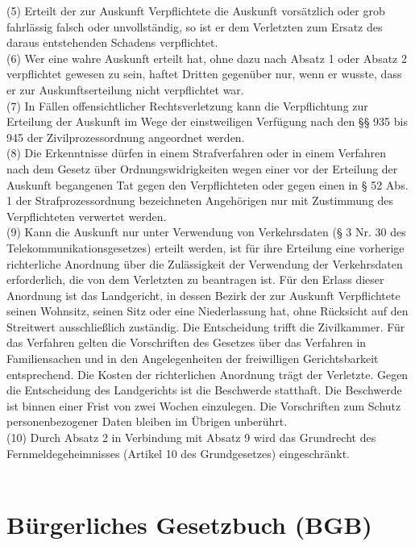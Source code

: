 \documentclass[12pt,titlepage]{report}
\begin{document}
(5) Erteilt der zur Auskunft Verpflichtete die Auskunft vorsätzlich oder grob fahrlässig falsch oder unvollständig, so ist er dem Verletzten zum Ersatz des daraus entstehenden Schadens verpflichtet.\\
(6) Wer eine wahre Auskunft erteilt hat, ohne dazu nach Absatz 1 oder Absatz 2 verpflichtet gewesen zu sein, haftet Dritten gegenüber nur, wenn er wusste, dass er zur Auskunftserteilung nicht verpflichtet war.\\
(7) In Fällen offensichtlicher Rechtsverletzung kann die Verpflichtung zur Erteilung der Auskunft im Wege der einstweiligen Verfügung nach den §§ 935 bis 945 der Zivilprozessordnung angeordnet werden.\\
(8) Die Erkenntnisse dürfen in einem Strafverfahren oder in einem Verfahren nach dem Gesetz über Ordnungswidrigkeiten wegen einer vor der Erteilung der Auskunft begangenen Tat gegen den Verpflichteten oder gegen einen in § 52 Abs. 1 der Strafprozessordnung bezeichneten Angehörigen nur mit Zustimmung des Verpflichteten verwertet werden.\\
(9) Kann die Auskunft nur unter Verwendung von Verkehrsdaten (§ 3 Nr. 30 des Telekommunikationsgesetzes) erteilt werden, ist für ihre Erteilung eine vorherige richterliche Anordnung über die Zulässigkeit der Verwendung der Verkehrsdaten erforderlich, die von dem Verletzten zu beantragen ist. Für den Erlass dieser Anordnung ist das Landgericht, in dessen Bezirk der zur Auskunft Verpflichtete seinen Wohnsitz, seinen Sitz oder eine Niederlassung hat, ohne Rücksicht auf den Streitwert ausschließlich zuständig. Die Entscheidung trifft die Zivilkammer. Für das Verfahren gelten die Vorschriften des Gesetzes über das Verfahren in Familiensachen und in den Angelegenheiten der freiwilligen Gerichtsbarkeit entsprechend. Die Kosten der richterlichen Anordnung trägt der Verletzte. Gegen die Entscheidung des Landgerichts ist die Beschwerde statthaft. Die Beschwerde ist binnen einer Frist von zwei Wochen einzulegen. Die Vorschriften zum Schutz personenbezogener Daten bleiben im Übrigen unberührt.\\
(10) Durch Absatz 2 in Verbindung mit Absatz 9 wird das Grundrecht des Fernmeldegeheimnisses (Artikel 10 des Grundgesetzes) eingeschränkt.\\\\

\section*{Bürgerliches Gesetzbuch (BGB)}
\end{document}
